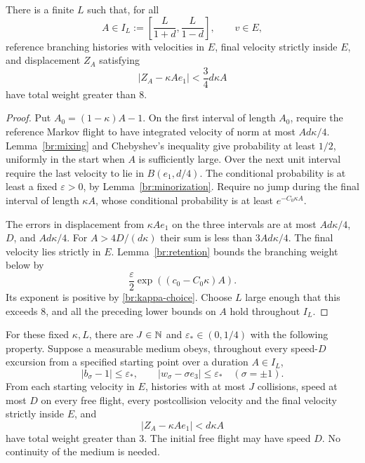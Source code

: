 \begin{lemma}\label{br:reference-block}
There is a finite \(L\) such that, for all
\[
A\in I_L:=\left[\frac L{1+d},\frac L{1-d}\right],\qquad v\in E,
\]
reference branching histories with velocities in \(E\), final velocity
strictly inside \(E\), and displacement \(Z_A\) satisfying
\begin{equation}\label{br:strict-drift}
|Z_A-\kappa Ae_1|<\frac34d\kappa A
\end{equation}
have total weight greater than 8.
\end{lemma}

\begin{proof}
Put \(A_0=(1-\kappa)A-1\). On the first interval of length \(A_0\),
require the reference Markov flight to have integrated velocity of
norm at most \(Ad\kappa/4\). Lemma~\ref{br:mixing} and Chebyshev's
inequality give probability at least \(1/2\), uniformly in the start
when \(A\) is sufficiently large. Over the next unit interval require
the last velocity to lie in \(B(e_1,d/4)\). The conditional probability
is at least a fixed \(\varepsilon>0\), by
Lemma~\ref{br:minorization}. Require no jump during the final interval
of length \(\kappa A\), whose conditional probability is at least
\(e^{-C_0\kappa A}\).

The errors in displacement from \(\kappa Ae_1\) on the three intervals
are at most \(Ad\kappa/4\), \(D\), and \(Ad\kappa/4\).
For \(A>4D/(d\kappa)\) their sum is less than \(3Ad\kappa/4\).
The final velocity lies strictly in \(E\).
Lemma~\ref{br:retention} bounds the branching weight below by
\[
\frac{\varepsilon}{2}\exp((c_0-C_0\kappa)A).
\]
Its exponent is positive by \eqref{br:kappa-choice}. Choose \(L\)
large enough that this exceeds 8, and all the preceding lower bounds
on \(A\) hold throughout \(I_L\).
\end{proof}

\begin{lemma}\label{br:robust-block}
For these fixed \(\kappa,L\), there are \(J\in\mathbb N\) and
\(\varepsilon_*\in(0,1/4)\) with the following property. Suppose a
measurable medium obeys, throughout every speed-\(D\) excursion from
a specified starting point over a duration \(A\in I_L\),
\begin{equation}\label{br:medium-closeness}
|b_\sigma-1|\le\varepsilon_*,
\qquad |w_\sigma-\sigma e_3|\le\varepsilon_*
\quad(\sigma=\pm1).
\end{equation}
From each starting velocity in \(E\), histories with at most \(J\)
collisions, speed at most \(D\) on every free flight, every
postcollision velocity and the final velocity strictly inside \(E\), and
\begin{equation}\label{br:robust-drift}
|Z_A-\kappa Ae_1|<d\kappa A
\end{equation}
have total weight greater than 3. The initial free flight may have
speed \(D\). No continuity of the medium is needed.
\end{lemma}


